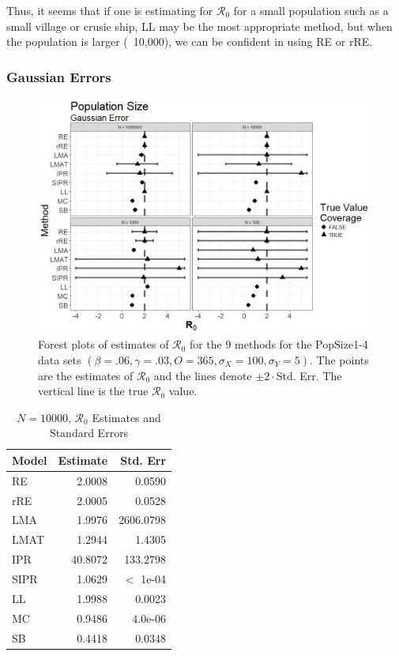\documentclass[12pt]{article}
\newcommand{\xxsir}{\ensuremath{9} } %
\newcommand{\rr}{\ensuremath{\mathcal{R}_0}}
\begin{document}
Thus, it seems that if one is estimating for $\rr$ for a small population such as a small village or crusie ship, LL may be the most appropriate method, but when the population is larger (~10,000), we can be confident in using RE or rRE.

\subsubsection{Gaussian Errors}

\begin{figure}[H]
	\centering
	\includegraphics[scale=0.5]{images/popsize_n.jpeg}
	\caption{Forest plots of estimates of $\rr$ for the \xxsir methods for the PopSize1-4 data sets $(\beta=.06, \gamma=.03, O=365, \sigma_X=100, \sigma_Y=5)$.  The points are the estimates of $\rr$ and the lines denote $\pm 2\cdot $Std. Err.  The vertical line is the true $\rr$ value.}\label{fig:inits-res2}
\end{figure}

\begin{table}[H]
	
	\centering
	\begin{tabular}[t]{l|r|r}
		\hline
		Model & Estimate & Std. Err\\
		\hline
		RE & 2.0008 & 0.0590\\
		\hline
		rRE & 2.0005 & 0.0528\\
		\hline
		LMA & 1.9976 & 2606.0798\\
		\hline
		LMAT & 1.2944 & 1.4305\\
		\hline
		IPR & 40.8072 & 133.2798\\
		\hline
		SIPR & 1.0629 &  $<$ 1e-04\\
		\hline
		LL & 1.9988 & 0.0023\\
		\hline
		MC & 0.9486 & 4.0e-06\\
		\hline
		SB & 0.4418 & 0.0348\\
		\hline
	\end{tabular}
\caption{$N = 10000$, $\rr$ Estimates and Standard Errors}\label{tab:n1-res2}
\end{table}
\end{document}

